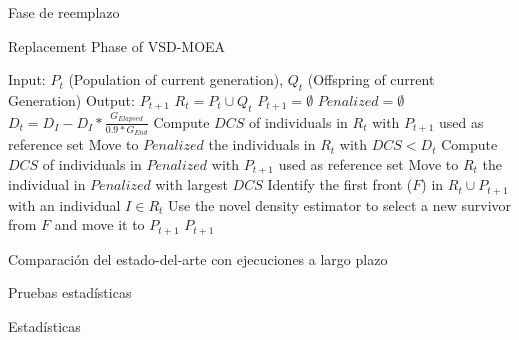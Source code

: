 \documentclass{beamer}
\begin{document}
\begin{frame}{Fase de reemplazo}
  \begin{algorithm}[H]
  \begin{scriptsize}
	\caption{Replacement Phase of VSD-MOEA} 

\begin{algorithmic}[1]
\STATE Input: $P_t$ (Population of current generation), $Q_t$ (Offspring of current Generation)
    	\STATE Output: $P_{t+1}$ 
        \STATE $R_t = P_t \cup Q_t$ \label{alg:1}
        \STATE $P_{t+1} = \emptyset$ \label{alg:2}
        \STATE $Penalized = \emptyset$ \label{alg:3}
				\STATE $D_t = D_I - D_I * \frac{G_{Elapsed}}{0.9*G_{End}}$ \label{alg:4}
         \label{alg:6}
					\STATE Compute $DCS$ of individuals in $R_t$ with $P_{t+1}$ used as reference set \label{alg:7}
					\STATE Move to $Penalized$ the individuals in $R_t$ with $DCS < D_t$  \label{alg:8}
        	 \label{alg:9}
						\STATE Compute $DCS$ of individuals in $Penalized$ with $P_{t+1}$ used as reference set \label{alg:10}
						\STATE Move to $R_t$ the individual in $Penalized$ with largest $DCS$ \label{alg:11}
        	\ENDIF
					\STATE Identify the first front ($F$) in $R_t \cup P_{t+1}$ with an individual $I \in R_t$ \label{alg:12}
					\STATE Use the novel density estimator  to select a new survivor 
					from $F$ and move it to $P_{t+1}$\label{alg:13}
        \ENDWHILE
    	\RETURN $P_{t+1}$ \label{alg:14}
	\end{algorithmic}

\label{alg:Replacement_Phase}
\end{scriptsize}
\end{algorithm}
\end{frame}


\begin{frame}{Comparación del estado-del-arte con ejecuciones a largo plazo}

\end{frame}


\begin{frame}{Pruebas estadísticas}
\end{frame}

\begin{frame}{Estadísticas}

\end{frame}
\end{document}
